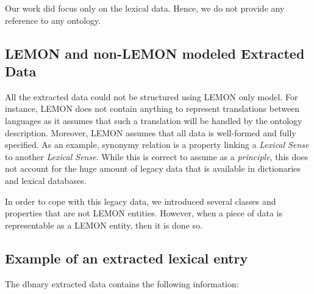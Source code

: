 \documentclass[10pt, a4paper]{article}
\begin{document}
Our work did focus only on the lexical data. Hence, we do not provide any reference to any ontology.  

\subsection{LEMON and non-LEMON modeled Extracted Data}

All the extracted data could not be structured using LEMON only model. For instance, LEMON does not contain anything to represent translations between languages as it assumes that such a translation will be handled by the ontology description. Moreover, LEMON assumes that all data is well-formed and fully specified. As an example, synonymy relation is a property linking a \textit{Lexical Sense} to another \textit{Lexical Sense}. While this is correct to assume as a \textit{principle}, this does not account for the huge amount of legacy data that is available in dictionaries and lexical databases.

In order to cope with this legacy data, we introduced several classes and properties that are not LEMON entities. However, when a piece of data is representable as a LEMON entity, then it is done so. 

\subsection{Example of an extracted lexical entry}

The dbnary extracted data contains the following information:
\end{document}
